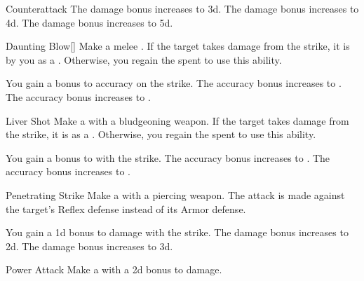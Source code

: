 {\begin{apability}{Counterattack}
                \rankline
                 The damage bonus increases to \plus3d.
                 The damage bonus increases to \plus4d.
                 The damage bonus increases to \plus5d.
            \end{apability}

            \begin{apability}{Daunting Blow}[]
                Make a melee .
                If the target takes damage from the strike, it is  by you as a .
                Otherwise, you regain the  spent to use this ability.

                \rankline
                 You gain a  bonus to accuracy on the strike.
                 The accuracy bonus increases to .
                 The accuracy bonus increases to .
            \end{apability}

            \begin{apability}{Liver Shot}
                Make a  with a bludgeoning weapon.
                If the target takes damage from the strike, it is \sickened as a .
                Otherwise, you regain the  spent to use this ability.

                \rankline
                 You gain a  bonus to  with the strike.
                 The accuracy bonus increases to .
                 The accuracy bonus increases to .
            \end{apability}

            \begin{apability}{Penetrating Strike}
                Make a  with a piercing weapon.
                The attack is made against the target's Reflex defense instead of its Armor defense.

                \rankline
                 You gain a \plus1d bonus to damage with the strike.
                 The damage bonus increases to \plus2d.
                 The damage bonus increases to \plus3d.
            \end{apability}

            \begin{apability}{Power Attack}
                Make a  with a \plus2d bonus to damage.


\end{apability}}
